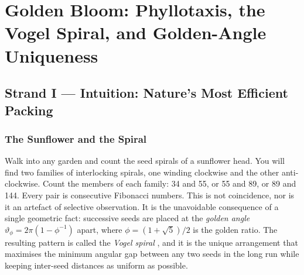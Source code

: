%
%

\chapter{Golden Bloom: Phyllotaxis, the Vogel Spiral, and Golden-Angle Uniqueness}
\label{ch:golden-bloom}


\section{Strand I — Intuition: Nature's Most Efficient Packing}
\label{sec:bloom-intuition}

\subsection{The Sunflower and the Spiral}
\label{subsec:sunflower}

Walk into any garden and count the seed spirals of a sunflower head.
You will find two families of interlocking spirals, one winding
clockwise and the other anti-clockwise.  Count the members of each
family: 34 and 55, or 55 and 89, or 89 and 144.  Every pair is
consecutive Fibonacci numbers.  This is not coincidence, nor is it an
artefact of selective observation.  It is the unavoidable consequence
of a single geometric fact: successive seeds are placed at the
\emph{golden angle} $\vartheta_\phi = 2\pi(1 - \phi^{-1})$ apart,
where $\phi = (1+\sqrt{5})/2$ is the golden ratio.  The resulting
pattern is called the \emph{Vogel spiral} \cite{vogel1979better}, and
it is the unique arrangement that maximises the minimum angular gap
between any two seeds in the long run while keeping inter-seed
distances as uniform as possible.


